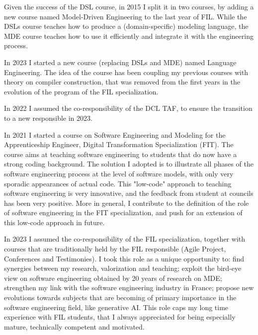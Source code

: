 \documentclass[10pt,a4paper]{article}
\begin{document}
Given the success of the DSL course, in 2015 I split it in two courses, by adding a new course named Model-Driven Engineering to the last year of FIL. While the DSLs course teaches how to produce a (domain-specific) modeling language, the MDE course teaches how to use it efficiently and integrate it with the engineering process. 

In 2023 I started a new course (replacing DSLs and MDE) named Language Engineering. The idea of the course has been coupling my previous courses with theory on compiler construction, that was removed from the first years in the evolution of the program of the FIL specialization. 

In 2022 I assumed the co-responsibility of the DCL TAF, to ensure the transition to a new responsible in 2023.  

\medskip
In 2021 I started a course on Software Engineering and Modeling for the Apprenticeship Engineer, Digital Transformation Specialization (FIT). The course aims at teaching software engineering to students that do now have a strong coding background. The solution I adopted is to illustrate all phases of the software engineering process at the level of software models, with only very sporadic appearances of actual code. This "low-code" approach to teaching software engineering is very innovative, and the feedback from student at councils has been very positive. More in general, I contribute to the definition of the role of software engineering in the FIT specialization, and push for an extension of this low-code approach in future.



\medskip 

In 2023 I assumed the co-responsibility of the FIL specialization, together with courses that are traditionally held by the FIL responsible (Agile Project, Conferences and Testimonies). 
I took this role as a unique opportunity to: find synergies between my research, valorization and teaching; exploit the bird-eye view on software engineering obtained by 20 years of research on MDE; strengthen my link with the software engineering industry in France; propose new evolutions towards subjects that are becoming of primary importance in the software engineering field, like generative AI. This role caps my long time experience with FIL students, that I always appreciated for being especially mature, technically competent and motivated.
\end{document}
